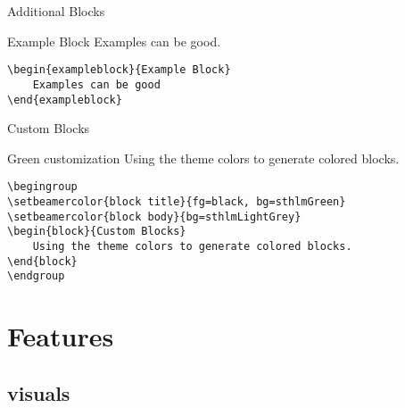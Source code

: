 \documentclass[compress,PxFont]{beamer}
\begin{document}

\begin{frame}[containsverbatim]{Additional Blocks}

\begin{exampleblock}{Example Block}
	Examples can be good.
\end{exampleblock}
\begin{verbatim}
\begin{exampleblock}{Example Block}
	Examples can be good
\end{exampleblock}
\end{verbatim}
\end{frame}


\begin{frame}[containsverbatim]{Custom Blocks}
\begingroup
{}
\begin{block}{Green customization}
	Using the theme colors to generate colored blocks.
\end{block}
\endgroup
\begin{verbatim}
\begingroup
\setbeamercolor{block title}{fg=black, bg=sthlmGreen}
\setbeamercolor{block body}{bg=sthlmLightGrey}
\begin{block}{Custom Blocks}
	Using the theme colors to generate colored blocks.
\end{block}
\endgroup
\end{verbatim}
\end{frame}

%
%
\section{Features}

\subsection{visuals}

\end{document}
